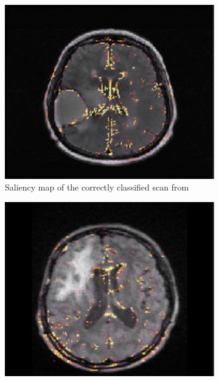 \begin{figure}[htbp]
    \begin{subfigure}[t]{0.25\textwidth}
        \centering
        \includegraphics[width=\textwidth]{Figures/FLAIR_Ivy_Saliency.png}
        \caption{Saliency map of the correctly classified \gls{scan} from }\label{fig:IvyGAP_FLAIR_saliency}
    \end{subfigure}
    \hfill
    \begin{subfigure}[t]{0.25\textwidth}
        \centering
        \includegraphics[width=\textwidth]{Figures/Appendix/FLAIR_RIDER_saliency.png}

\end{subfigure}
\end{figure}
